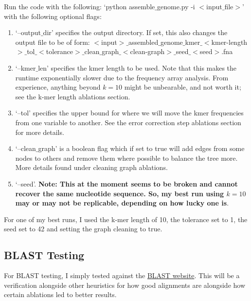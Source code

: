 \documentclass[10pt]{article}
\begin{document}
Run the code with the following: `python assemble$\_$genome.py -i $<$input$\_$file$>$' with the following optional flags:
\begin{enumerate}
  \item `--output$\_$dir' specifies the output directory. If set, this also changes the output file to be of form: $<$input$>\_$assembled$\_$genome$\_$kmer$\_<$kmer-length$>\_$tol$\_<$tolerance$>\_$clean$\_$graph$\_<$clean-graph$>\_$seed$\_<$seed$>$.fna
  \item `--kmer$\_$len' specifies the kmer length to be used. Note that this makes the runtime exponentially slower due to the frequency array analysis. From experience, anything beyond $k=10$ might be unbearable, and not worth it; see the k-mer length ablations section.
  \item `--tol' specifies the upper bound for where we will move the kmer frequencies from one variable to another. See the error correction step ablations section for more details.
  \item `--clean$\_$graph' is a boolean flag which if set to true will add edges from some nodes to others and remove them where possible to balance the tree more. More details found under cleaning graph ablations.
  \item `--seed'. \textbf{Note: This at the moment seems to be broken and cannot recover the same nucleotide sequence. So, my best run using $k = 10$ may or may not be replicable, depending on how lucky one is}.
\end{enumerate}

For one of my best runs, I used the k-mer length of 10, the tolerance set to 1, the seed set to 42 and setting the graph cleaning to true.

\newpage

\subsection*{BLAST Testing}
For BLAST testing, I simply tested against the \href{https://blast.ncbi.nlm.nih.gov/Blast.cgi?PROGRAM=blastn&PAGE_TYPE=BlastSearch&LINK_LOC=blasthome}{BLAST website}. This will be a verification alongside other heuristics for how good alignments are alongside how certain ablations led to better results.\\
\end{document}
